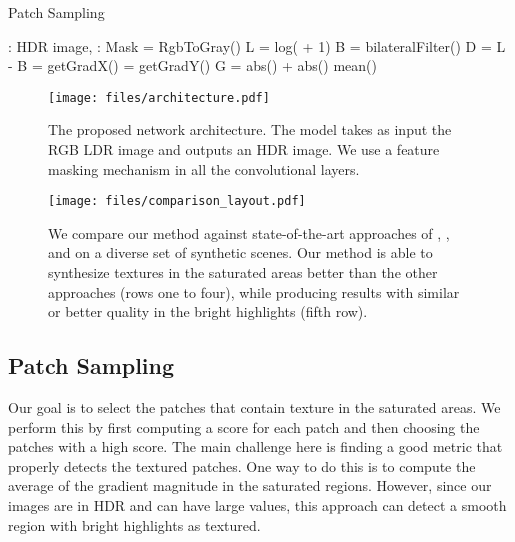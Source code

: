 \begin{algorithm}[t]
\caption{Patch Sampling}
\label{alg:patches_selection}
\begin{algorithmic}[1]
    \State : HDR image, : Mask
    \State  {}
    \State  {}
    \State  = RgbToGray()
    \State L = log( + 1)
    \State B = bilateralFilter()
    \State D = L - B
    \State  = getGradX()
    \State  = getGradY()
    \State G = abs() + abs()
    \State \Return mean()
\EndProcedure
\end{algorithmic}
\end{algorithm}

\begin{figure}
\centering
\vspace{-0.20in}
\texttt{[image: files/architecture.pdf]}
\vspace{-0.30in}
\caption{The proposed network architecture. The model takes as input the RGB LDR image and outputs an HDR image. We use a feature masking mechanism in all the convolutional layers. }
\vspace{-0.3in}
\label{fig:architecture}
\end{figure}

\begin{figure*}
  \texttt{[image: files/comparison\_layout.pdf]}
  \vspace{-0.30in}
  \caption{We compare our method against state-of-the-art approaches of \citet{endo2017deep}, \citet{eilertsen2017hdr}, and \citet{marnerides2018expandnet} on a diverse set of synthetic scenes. Our method is able to synthesize textures in the saturated areas better than the other approaches (rows one to four), while producing results with similar or better quality in the bright highlights (fifth row).}
  \vspace{-0.20in}
  \label{fig:comparison}
\end{figure*}

\subsection{Patch Sampling}
\label{sec:patch_sampling}

Our goal is to select the patches that contain texture in the saturated areas. We perform this by first computing a score for each patch and then choosing the patches with a high score. The main challenge here is finding a good metric that properly detects the textured patches. One way to do this is to compute the average of the gradient magnitude in the saturated regions. However, since our images are in HDR and can have large values, this approach can detect a smooth region with bright highlights as textured.

